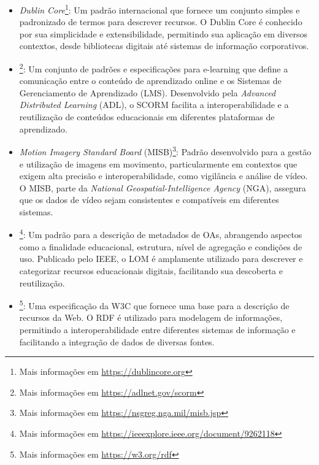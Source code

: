 \begin{itemize}
    \item \textit{Dublin Core}\footnote{Mais informações em \url{https://dublincore.org}}: Um padrão internacional que fornece um conjunto simples e padronizado de termos para descrever recursos. O Dublin Core é conhecido por sua simplicidade e extensibilidade, permitindo sua aplicação em diversos contextos, desde bibliotecas digitais até sistemas de informação corporativos.
    \item {}\footnote{Mais informações em \url{https://adlnet.gov/scorm}}: Um conjunto de padrões e especificações para e-learning que define a comunicação entre o conteúdo de aprendizado online e os Sistemas de Gerenciamento de Aprendizado (LMS). Desenvolvido pela \textit{Advanced Distributed Learning} (ADL), o SCORM facilita a interoperabilidade e a reutilização de conteúdos educacionais em diferentes plataformas de aprendizado.
    \item \textit{Motion Imagery Standard Board} (MISB)\footnote{Mais informações em \url{https://nsgreg.nga.mil/misb.jsp}}: Padrão desenvolvido para a gestão e utilização de imagens em movimento, particularmente em contextos que exigem alta precisão e interoperabilidade, como vigilância e análise de vídeo. O MISB, parte da \textit{National Geospatial-Intelligence Agency} (NGA), assegura que os dados de vídeo sejam consistentes e compatíveis em diferentes sistemas.
    \item {}\footnote{Mais informações em \url{https://ieeexplore.ieee.org/document/9262118}}: Um padrão para a descrição de metadados de OAs, abrangendo aspectos como a finalidade educacional, estrutura, nível de agregação e condições de uso. Publicado pelo IEEE, o LOM é amplamente utilizado para descrever e categorizar recursos educacionais digitais, facilitando sua descoberta e reutilização.
    \item {}\footnote{Mais informações em \url{https://w3.org/rdf}}: Uma especificação da W3C que fornece uma base para a descrição de recursos da Web. O RDF é utilizado para modelagem de informações, permitindo a interoperabilidade entre diferentes sistemas de informação e facilitando a integração de dados de diversas fontes.
\end{itemize}


